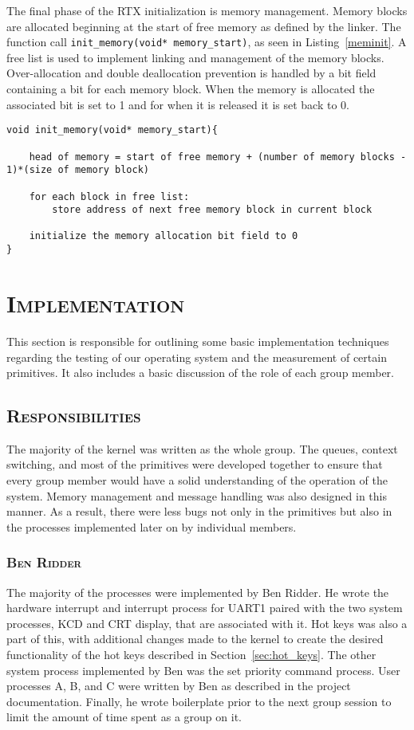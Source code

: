 \documentclass[oneside]{report}
\begin{document}
The final phase of the RTX initialization is memory management.  Memory blocks
are allocated beginning at the start of free memory as defined by the linker.
The function call \texttt{init\_memory(void* memory\_start)}, as seen in
Listing~\ref{meminit}. A free list is used to implement linking and management
of the memory blocks. Over-allocation and double deallocation prevention is
handled by a bit field containing a bit for each memory block. When the memory
is allocated the associated bit is set to 1 and for when it is released it is
set back to 0.

\begin{lstlisting}
void init_memory(void* memory_start){
    
    head of memory = start of free memory + (number of memory blocks - 1)*(size of memory block)
    
    for each block in free list:
        store address of next free memory block in current block

    initialize the memory allocation bit field to 0
}
\end{lstlisting}


\section{\textsc{Implementation}}
This section is responsible for outlining some basic implementation techniques 
regarding the testing of our operating system and the measurement of certain 
primitives. It also includes a basic discussion of the role of each group member. 
 
\subsection{\textsc{Responsibilities}}
The majority of the kernel was written as the whole group. The queues, context
switching, and most of the primitives were developed together to ensure that
every group member would have a solid understanding of the operation of the
system. Memory management and message handling was also designed in this
manner. As a result, there were less bugs not only in the primitives but also
in the processes implemented later on by individual members.

\subsubsection{\textsc{Ben Ridder}}
The majority of the processes were implemented by Ben Ridder. He wrote the
hardware interrupt and interrupt process for UART1 paired with the two system
processes, KCD and CRT display, that are associated with it. Hot keys was also
a part of this, with additional changes made to the kernel to create the
desired functionality of the hot keys described in Section~\ref{sec:hot_keys}.
The other system process implemented by Ben was the set priority command
process. User processes A, B, and C were written by Ben as described in the
project documentation. Finally, he wrote boilerplate prior to the next group
session to limit the amount of time spent as a group on it.
\end{document}
